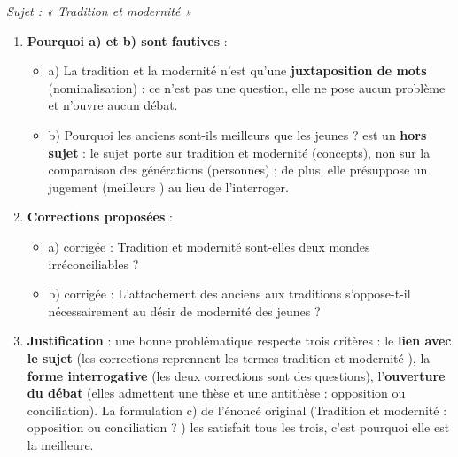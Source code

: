 \documentclass[11pt]{article}
\newcounter{popsec}
\newcounter{popsub}
\newcommand{\courssub}[1]{%
  \stepcounter{popsub}%
  \par\vspace{9pt}\noindent{\popxbold\fontsize{11.5}{13}\selectfont\color{popink}{\color{poporange}\thepopsec.\thepopsub}\hspace{6pt}#1}\par\nopagebreak\vspace{4pt}
}
\begin{document}
\begin{corrige}
\textit{Sujet : « Tradition et modernité »}
\begin{enumerate}
\item \textbf{Pourquoi a) et b) sont fautives} :
\begin{itemize}
\item a) \og La tradition et la modernité \fg{} n'est qu'une \textbf{juxtaposition de mots} (nominalisation) : ce n'est pas une question, elle ne pose aucun problème et n'ouvre aucun débat.
\item b) \og Pourquoi les anciens sont-ils meilleurs que les jeunes ? \fg{} est un \textbf{hors sujet} : le sujet porte sur tradition et modernité (concepts), non sur la comparaison des générations (personnes) ; de plus, elle présuppose un jugement (\og meilleurs \fg) au lieu de l'interroger.
\end{itemize}
\item \textbf{Corrections proposées} :
\begin{itemize}
\item a) corrigée : \og Tradition et modernité sont-elles deux mondes irréconciliables ? \fg
\item b) corrigée : \og L'attachement des anciens aux traditions s'oppose-t-il nécessairement au désir de modernité des jeunes ? \fg
\end{itemize}
\item \textbf{Justification} : une bonne problématique respecte trois critères : le \textbf{lien avec le sujet} (les corrections reprennent les termes \og tradition \fg{} et \og modernité \fg), la \textbf{forme interrogative} (les deux corrections sont des questions), l'\textbf{ouverture du débat} (elles admettent une thèse et une antithèse : opposition ou conciliation). La formulation c) de l'énoncé original (\og Tradition et modernité : opposition ou conciliation ? \fg) les satisfait tous les trois, c'est pourquoi elle est la meilleure.
\end{enumerate}
\end{corrige}

\courssub{La recherche des idées}
\end{document}
